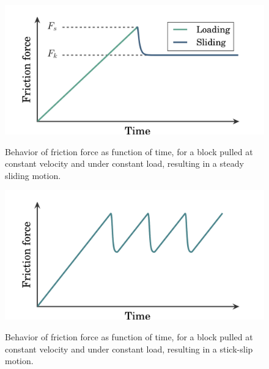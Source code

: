 \documentclass[twoside,english]{uiofysmaster}
\begin{document}


\begin{figure}[H]
	\centering
	\begin{minipage}{0.9\linewidth}
		\begin{minipage}{\linewidth}
			\centering
			\includegraphics[width=0.7\linewidth]{figures/friction/steadySlide}
			\caption{Behavior of friction force as function of time, for a block pulled at constant velocity and under constant load, resulting in a steady sliding motion.}
			\label{fig:steadyslide}
		\end{minipage}
		\begin{minipage}{\linewidth}
			\vspace{0.5cm}
			\centering
			\includegraphics[width=0.7\linewidth]{figures/friction/stick-slip}
			\caption{Behavior of friction force as function of time, for a block pulled at constant velocity and under constant load, resulting in a stick-slip motion.}
			\label{fig:stick-slip}
		\end{minipage}
		\begin{minipage}{\linewidth}
			\vspace{1cm}
		\end{minipage}
	\end{minipage}
\end{figure}
\end{document}
